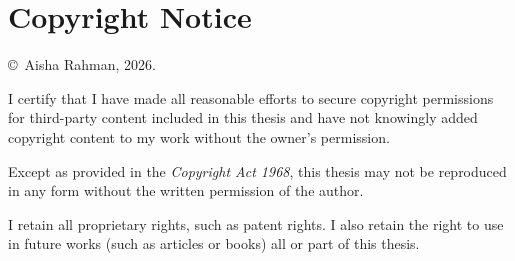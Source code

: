 \chapter*{Copyright Notice}

\noindent \copyright\ Aisha Rahman, 2026.

\vspace{0.4cm}
\noindent I certify that I have made all reasonable efforts to secure copyright permissions for third-party content included in this thesis and have not knowingly added copyright content to my work without the owner's permission.

\vspace{0.4cm}
\noindent Except as provided in the \emph{Copyright Act 1968}, this thesis may not be reproduced in any form without the written permission of the author.

\vspace{0.4cm}
\noindent I retain all proprietary rights, such as patent rights. I also retain the right to use in future works (such as articles or books) all or part of this thesis.

